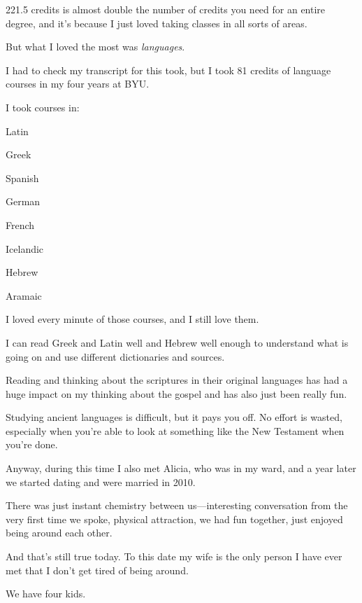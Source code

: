 \begin{compactitem}
\begin{compactitem}
					\item 221.5 credits is almost double the number of credits you need for an entire degree, and it's because I just loved taking classes in all sorts of areas. 
					\item But what I loved the most was \textit{languages}.
					\item I had to check my transcript for this took, but I took 81 credits of language courses in my four years at BYU.
					\item I took courses in:
						\begin{compactitem}
							\item Latin
							\item Greek
							\item Spanish
							\item German
							\item French
							\item Icelandic
							\item Hebrew
							\item Aramaic
						\end{compactitem}
					\item I loved every minute of those courses, and I still love them.
					\item I can read Greek and Latin well and Hebrew well enough to understand what is going on and use different dictionaries and sources.
					\item Reading and thinking about the scriptures in their original languages has had a huge impact on my thinking about the gospel and has also just been really fun.
					\item Studying ancient languages is difficult, but it pays you off. No effort is wasted, especially when you're able to look at something like the New Testament when you're done.
					\item Anyway, during this time I also met Alicia, who was in my ward, and a year later we started dating and were married in 2010. 
						\begin{compactitem}
							\item There was just instant chemistry between us---interesting conversation from the very first time we spoke, physical attraction, we had fun together, just enjoyed being around each other.
							\item And that's still true today. To this date my wife is the only person I have ever met that I don't get tired of being around.
							\item We have four kids.

\end{compactitem}
\end{compactitem}
\end{compactitem}
